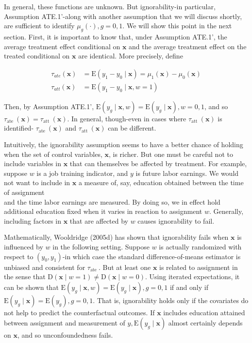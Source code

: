 \documentclass[10pt]{article}
\begin{document}
In general, these functions are unknown. But ignorability-in particular, Assumption ATE.1'-along with another assumption that we will discuss shortly, are sufficient to identify $\mu_{g}(\cdot), g=0,1$. We will show this point in the next section. First, it is important to know that, under Assumption ATE.1', the average treatment effect conditional on $\mathbf{x}$ and the average treatment effect on the treated conditional on $\mathbf{x}$ are identical. More precisely, define


\begin{align*}
\tau_{a t e}(\mathbf{x}) & =\mathrm{E}\left(y_{1}-y_{0} \mid \mathbf{x}\right)=\mu_{1}(\mathbf{x})-\mu_{0}(\mathbf{x})  \tag{21.8}\\
\tau_{a t t}(\mathbf{x}) & =\mathrm{E}\left(y_{1}-y_{0} \mid \mathbf{x}, w=1\right) \tag{21.9}
\end{align*}


Then, by Assumption ATE.1', $\mathrm{E}\left(y_{g} \mid \mathbf{x}, w\right)=\mathrm{E}\left(y_{g} \mid \mathbf{x}\right), w=0,1$, and so $\tau_{\text {ate }}(\mathbf{x})= \tau_{\text {att }}(\mathbf{x})$. In general, though-even in cases where $\tau_{\text {att }}(\mathbf{x})$ is identified- $\tau_{\text {ate }}(\mathbf{x})$ and $\tau_{\text {att }}(\mathbf{x})$ can be different.

Intuitively, the ignorability assumption seems to have a better chance of holding when the set of control variables, $\mathbf{x}$, is richer. But one must be careful not to include variables in $\mathbf{x}$ that can themselves be affected by treatment. For example, suppose $w$ is a job training indicator, and $y$ is future labor earnings. We would not want to include in $\mathbf{x}$ a measure of, say, education obtained between the time of assignment\\
and the time labor earnings are measured. By doing so, we in effect hold additional education fixed when it varies in reaction to assignment $w$. Generally, including factors in $\mathbf{x}$ that are affected by $w$ causes ignorability to fail.

Mathematically, Wooldridge (2005d) has shown that ignorability fails when $\mathbf{x}$ is influenced by $w$ in the following setting. Suppose $w$ is actually randomized with respect to $\left(y_{0}, y_{1}\right)$-in which case the standard difference-of-means estimator is unbiased and consistent for $\tau_{\text {ate }}$. But at least one $\mathbf{x}$ is related to assignment in the sense that $\mathrm{D}(\mathbf{x} \mid w=1) \neq \mathrm{D}(\mathbf{x} \mid w=0)$. Using iterated expectations, it can be shown that $\mathrm{E}\left(y_{g} \mid \mathbf{x}, w\right)=\mathrm{E}\left(y_{g} \mid \mathbf{x}\right), g=0,1$ if and only if $\mathrm{E}\left(y_{g} \mid \mathbf{x}\right)=\mathrm{E}\left(y_{g}\right), g=0,1$. That is, ignorability holds only if the covariates do not help to predict the counterfactual outcomes. If $\mathbf{x}$ includes education attained between assignment and measurement of $y, \mathrm{E}\left(y_{g} \mid \mathbf{x}\right)$ almost certainly depends on $\mathbf{x}$, and so unconfoundedness fails.
\end{document}
